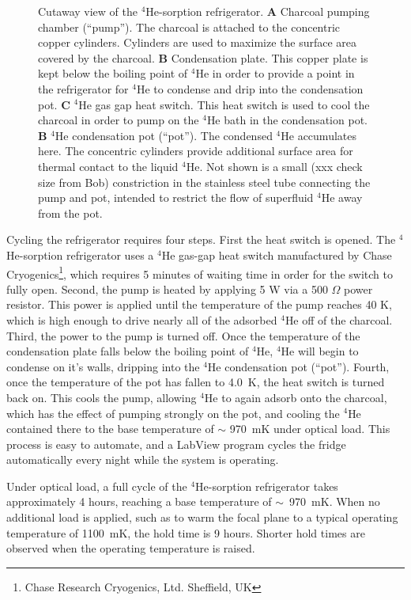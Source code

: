 \documentclass[10pt,twocolumn,article]{memoir}
\newcommand*{\He}[1]{$^{#1}$He\xspace}
\newcommand*{\Ohm}{\ensuremath{\Omega}\xspace}
\begin{document}
\begin{figure}[th]
\caption{Cutaway view of the \He4-sorption refrigerator. \textbf{A} Charcoal pumping chamber (``pump''). The charcoal is attached to the concentric copper cylinders. Cylinders are used to maximize the surface area covered by the charcoal. \textbf{B} Condensation plate. This copper plate is kept below the boiling point of \He4 in order to provide a point in the refrigerator for \He4 to condense and drip into the condensation pot. \textbf{C} \He4 gas gap heat switch. This heat switch is used to cool the charcoal in order to pump on the \He4 bath in the condensation pot. \textbf{B} \He4 condensation pot (``pot''). The condensed \He4 accumulates here. The concentric cylinders provide additional surface area for thermal contact to the liquid \He4. Not shown is a small (xxx check size from Bob) constriction in the stainless steel tube connecting the pump and pot, intended to restrict the flow of superfluid \He4 away from the pot.}
\label{fig:he4sorp}
\end{figure}

Cycling the refrigerator requires four steps.
First the heat switch is opened.
The \He4-sorption refrigerator uses a \He4 gas-gap heat switch manufactured by Chase Cryogenics\footnote{Chase Research Cryogenics, Ltd. Sheffield, UK}, which requires 5 minutes of waiting time in order for the switch to fully open.
Second, the pump is heated by applying 5 W via a 500 \Ohm power resistor.
This power is applied until the temperature of the pump reaches 40 K, which is high enough to drive nearly all of the adsorbed \He4 off of the charcoal.
Third, the power to the pump is turned off.
Once the temperature of the condensation plate falls below the boiling point of \He4, \He4 will begin to condense on it's walls, dripping into the \He4 condensation pot (``pot'').
Fourth, once the temperature of the pot has fallen to 4.0~K, the heat switch is turned back on.
This cools the pump, allowing \He4 to again adsorb onto the charcoal, which has the effect of pumping strongly on the pot, and cooling the \He4 contained there to the base temperature of $\sim$ 970~mK under optical load.
This process is easy to automate, and a LabView program cycles the fridge automatically every night while the system is operating.

Under optical load, a full cycle of the \He4-sorption refrigerator takes approximately 4 hours, reaching a base temperature of $\sim$~970~mK.
When no additional load is applied, such as to warm the focal plane to a typical operating temperature of 1100~mK, the hold time is 9 hours.
Shorter hold times are observed when the operating temperature is raised. %
\end{document}

